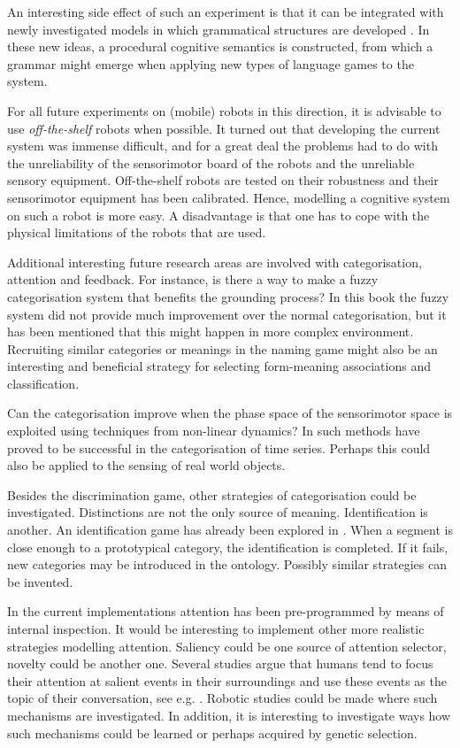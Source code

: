 An interesting side effect of such an experiment is that it can be integrated with newly investigated models in which grammatical structures are developed \citep{steels:2000a}. In these new ideas, a procedural cognitive semantics is constructed, from which a grammar might emerge when applying new types of language games to the system.

For all future experiments on (mobile) robots in this direction, it is advisable to use {\em off-the-shelf} robots when possible. It turned out that developing the current system was immense difficult, and for a great deal the problems had to do with the unreliability of the sensorimotor board of the robots and the unreliable sensory equipment. Off-the-shelf robots are tested on their robustness and their sensorimotor equipment has been calibrated. Hence, modelling a cognitive system on such a robot is more easy. A disadvantage is that one has to cope with the physical limitations of the robots that are used.


Additional interesting future research areas are involved with categorisation, attention and feedback. For instance, is there a way to make a fuzzy categorisation system that benefits the grounding process? In this book the fuzzy system did not provide much improvement over the normal categorisation, but it has been mentioned that this might happen in more complex environment. Recruiting similar categories or meanings in the naming game \citep{kaplan:2000} might also be an interesting and beneficial strategy for selecting form-meaning associations and classification.

Can the categorisation improve when the phase space of the sensorimotor space is exploited using techniques from non-linear dynamics? In \citep{rosenstein:1998a,vogt:1999a} such methods have proved to be successful in the categorisation of time series. Perhaps this could also be applied to the sensing of real world objects. 

Besides the discrimination game, other strategies of categorisation could be investigated. Distinctions are not the only source of meaning. Identification is another. An identification game has already been explored in \citep{vogt:1999a,vogt:2000}. When a segment is close enough to a prototypical category, the identification is completed. If it fails, new categories may be introduced in the ontology. Possibly similar strategies can be invented.


In the current implementations attention has been pre-programmed by means of internal inspection. It would be interesting to implement other more realistic strategies modelling attention. Saliency could be one source of attention selector, novelty could be another one. Several studies argue that humans tend to focus their attention at salient events in their surroundings and use these events as the topic of their conversation, see e.g. \citep{dessalles:2000}. Robotic studies could be made where such mechanisms are investigated. In addition, it is interesting to investigate ways how such mechanisms could be learned or perhaps acquired by genetic selection. 

